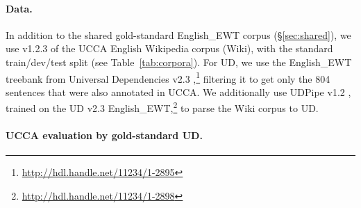 \documentclass[11pt,a4paper]{article}
\begin{document}
\paragraph{Data.}

In addition to the shared gold-standard English\_EWT corpus (\S\ref{sec:shared}),
we use v1.2.3 of the UCCA English Wikipedia corpus (Wiki),
with the standard train/dev/test split (see Table~\ref{tab:corpora}).
For UD,
we use the English\_EWT treebank from Universal Dependencies v2.3
\cite{11234/1-2895},\footnote{\url{http://hdl.handle.net/11234/1-2895}}
filtering it to get only the 804 sentences that were also annotated in UCCA.
We additionally use UDPipe v1.2 \cite{udpipe,udpipe:2017},
trained on the UD v2.3
English\_EWT,\footnote{\url{http://hdl.handle.net/11234/1-2898}}
to parse the Wiki corpus to UD.



%


\paragraph{UCCA evaluation by gold-standard UD.}
\end{document}
